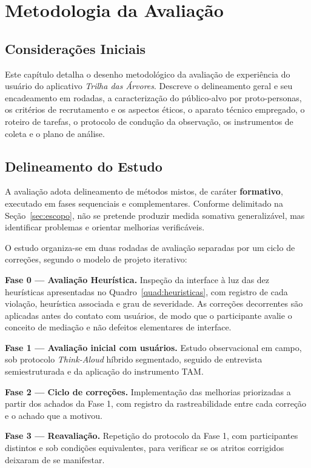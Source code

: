 \chapter{Metodologia da Avaliação}
\label{cap:metodologia}

\section{Considerações Iniciais}
\label{sec:met_consideracoes}

Este capítulo detalha o desenho metodológico da avaliação de experiência do
usuário do aplicativo \textit{Trilha das Árvores}. Descreve o delineamento geral e
seu encadeamento em rodadas, a caracterização do público-alvo por proto-personas,
os critérios de recrutamento e os aspectos éticos, o aparato técnico empregado, o
roteiro de tarefas, o protocolo de condução da observação, os instrumentos de
coleta e o plano de análise.

\section{Delineamento do Estudo}
\label{sec:delineamento}

A avaliação adota delineamento de métodos mistos, de caráter \textbf{formativo},
executado em fases sequenciais e complementares. Conforme delimitado na
Seção~\ref{sec:escopo}, não se pretende produzir medida somativa generalizável,
mas identificar problemas e orientar melhorias verificáveis.

O estudo organiza-se em duas rodadas de avaliação separadas por um ciclo de
correções, segundo o modelo de projeto iterativo:

\begin{alineas}
  \item \textbf{Fase 0 --- Avaliação Heurística.} Inspeção da interface à luz das
  dez heurísticas apresentadas no Quadro~\ref{quad:heuristicas}, com registro de
  cada violação, heurística associada e grau de severidade. As correções
  decorrentes são aplicadas antes do contato com usuários, de modo que o
  participante avalie o conceito de mediação e não defeitos elementares de
  interface.

  \item \textbf{Fase 1 --- Avaliação inicial com usuários.} Estudo observacional
  em campo, sob protocolo \textit{Think-Aloud} híbrido segmentado, seguido de
  entrevista semiestruturada e da aplicação do instrumento TAM.

  \item \textbf{Fase 2 --- Ciclo de correções.} Implementação das melhorias
  priorizadas a partir dos achados da Fase 1, com registro da rastreabilidade
  entre cada correção e o achado que a motivou.

  \item \textbf{Fase 3 --- Reavaliação.} Repetição do protocolo da Fase 1, com
  participantes distintos e sob condições equivalentes, para verificar se os
  atritos corrigidos deixaram de se manifestar.
\end{alineas}

